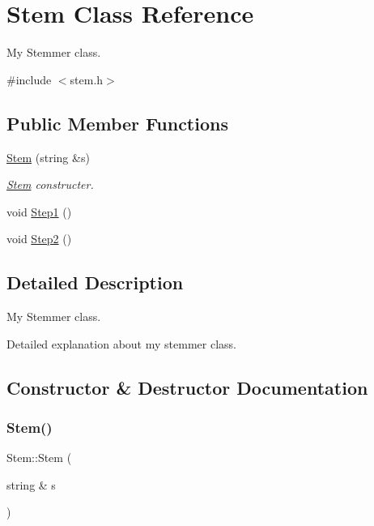 \hypertarget{class_stem}{}\section{Stem Class Reference}
\label{class_stem}


My Stemmer class.  




{\ttfamily \#include $<$stem.\+h$>$}

\subsection*{Public Member Functions}
\begin{DoxyCompactItemize}
\item 
\hyperlink{class_stem_a2b8b95a758defb2542da3aee21bd3463}{Stem} (string \&s)
\begin{DoxyCompactList}\small\item\em \hyperlink{class_stem}{Stem} constructer. \end{DoxyCompactList}\item 
void \hyperlink{class_stem_a0664001fe76935498f49932b446d43c3}{Step1} ()
\item 
void \hyperlink{class_stem_a95139a3503d1ce3307635cc714af22b8}{Step2} ()
\end{DoxyCompactItemize}


\subsection{Detailed Description}
My Stemmer class. 

Detailed explanation about my stemmer class. 

\subsection{Constructor \& Destructor Documentation}
\mbox{\label{class_stem_a2b8b95a758defb2542da3aee21bd3463}} 
\subsubsection{\texorpdfstring{Stem()}{Stem()}}
{\footnotesize\ttfamily Stem\+::\+Stem (\begin{DoxyParamCaption}\item[{string \&}]{s }\end{DoxyParamCaption})\hspace{0.3cm}{\ttfamily [inline]}}




